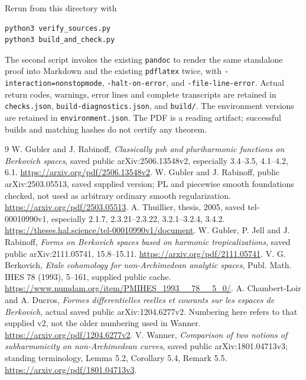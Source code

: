 \documentclass[11pt]{article}
\theoremstyle{remark}
\begin{document}
Rerun from this directory with
\begin{verbatim}
python3 verify_sources.py
python3 build_and_check.py
\end{verbatim}
The second script invokes the existing \texttt{pandoc} to render the same
standalone proof into Markdown and the existing \texttt{pdflatex} twice,
with \texttt{-interaction=nonstopmode}, \texttt{-halt-on-error}, and
\texttt{-file-line-error}.
Actual return codes, warnings, error lines and complete transcripts are
retained in \texttt{checks.json}, \nolinkurl{build-diagnostics.json}, and
\texttt{build/}. The environment versions are retained in
\texttt{environment.json}. The PDF is a reading artifact; successful
builds and matching hashes do not certify any theorem.

\begin{thebibliography}{9}
 W. Gubler and J. Rabinoff,
\emph{Classically psh and pluriharmonic functions on Berkovich spaces},
saved public arXiv:2506.13548v2, especially 3.4--3.5, 4.1--4.2, 6.1.
\url{https://arxiv.org/pdf/2506.13548v2}.
 W. Gubler and J. Rabinoff, public arXiv:2503.05513,
saved supplied version; PL and piecewise smooth foundations checked,
not used as arbitrary ordinary smooth regularization.
\url{https://arxiv.org/pdf/2503.05513}.
 A. Thuillier, thesis, 2005, saved tel-00010990v1,
especially 2.1.7, 2.3.21--2.3.22, 3.2.1--3.2.4, 3.4.2.
\url{https://theses.hal.science/tel-00010990v1/document}.
 W. Gubler, P. Jell and J. Rabinoff,
\emph{Forms on Berkovich spaces based on harmonic tropicalizations},
saved public arXiv:2111.05741, 15.8--15.11.
\url{https://arxiv.org/pdf/2111.05741}.
 V. G. Berkovich, \emph{Etale cohomology for non-Archimedean
analytic spaces}, Publ. Math. IHES 78 (1993), 5--161, supplied public cache.
\url{https://www.numdam.org/item/PMIHES_1993__78__5_0/}.
 A. Chambert-Loir and A. Ducros,
\emph{Formes differentielles reelles et courants sur les espaces de
Berkovich}, actual saved public arXiv:1204.6277v2. Numbering here refers
to that supplied v2, not the older numbering used in Wanner.
\url{https://arxiv.org/pdf/1204.6277v2}.
 V. Wanner, \emph{Comparison of two notions of subharmonicity
on non-Archimedean curves}, saved public arXiv:1801.04713v3;
standing terminology, Lemma 5.2, Corollary 5.4, Remark 5.5.
\url{https://arxiv.org/pdf/1801.04713v3}.
\end{thebibliography}
\end{document}
